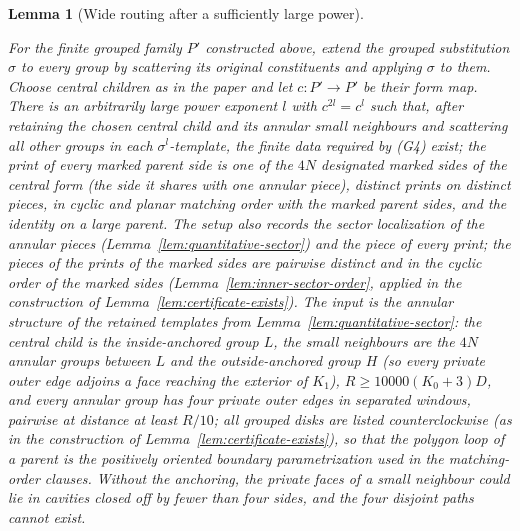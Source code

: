 \documentclass[11pt,a4paper]{article}
\newtheorem{lemma}[definition]{Lemma}
\theoremstyle{remark}
\newcommand{\lean}[1]{}
\newcommand{\uses}[1]{}
\begin{document}
\begin{lemma}[Wide routing after a sufficiently large power]
\label{lem:routing}
\lean{Tilings.Geometry.existsRoutingAfterPower}
\uses{def:mesh,def:certificate,lem:quantitative-sector,lem:finite-idempotent}
For the finite grouped family $P'$ constructed above, extend the grouped
substitution $\sigma$ to every group by scattering its original
constituents and applying $\sigma$ to them.  Choose central children as
in the paper and let $c:P'\to P'$ be their form map.  There is an
arbitrarily large power exponent $l$ with $c^{2l}=c^l$ such that, after
retaining the chosen central child and its annular small neighbours and
scattering all other groups in each $\sigma^l$-template, the finite data
required by (G4) exist; the print of every marked parent side is one of the
$4N$ designated marked sides of the central form (the side it shares with one
annular piece), distinct prints on distinct pieces, in cyclic and planar
matching order with the marked parent sides, and the identity on a large
parent.  The setup also records the sector localization of the annular
pieces (Lemma~\ref{lem:quantitative-sector}) and the piece of every print;
the pieces of the prints of the marked sides are pairwise distinct and in
the cyclic order of the marked sides (Lemma~\ref{lem:inner-sector-order},
applied in the construction of Lemma~\ref{lem:certificate-exists}).  The
input is the annular structure of the retained
templates from Lemma~\ref{lem:quantitative-sector}: the central child is the
inside-anchored group $L$, the small neighbours are the $4N$ annular groups
between $L$ and the outside-anchored group $H$ (so every private outer edge
adjoins a face reaching the exterior of $K_1$), $R\ge10000(K_0+3)D$, and
every annular group has four private outer edges in separated windows,
pairwise at distance at least $R/10$; all grouped disks are listed
counterclockwise (as in the construction of
Lemma~\ref{lem:certificate-exists}), so that the polygon loop of a parent
is the positively oriented boundary parametrization used in the
matching-order clauses.  Without the anchoring, the private
faces of a small neighbour could lie in cavities closed off by fewer than
four sides, and the four disjoint paths cannot exist.
\end{lemma}
\end{document}
